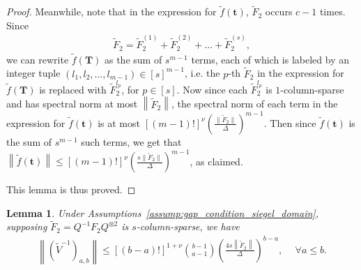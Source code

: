 \documentclass[superscriptaddress,onecolumn,nofootinbib,longbibliography,a4paper,accepted=2026-09-29]{quantumarticle}
\theoremstyle{plain}
\newtheorem{lemma}[thm]{Lemma}
\theoremstyle{definition}
\numberwithin{thm}{section}
\numberwithin{assumption}{section}
\numberwithin{lemma}{section}
\numberwithin{prop}{section}
\numberwithin{cor}{section}
\numberwithin{definition}{section}
\numberwithin{rmk}{section}
\numberwithin{equation}{section}
\newcommand{\norm}[1]     {\left\| #1 \right\|}
\newcommand{\lrb}[1]{\left ( #1 \right )}
\newcommand{\lrsb}[1]{\left [ #1 \right ]}
\newcommand{\mbt}{\mathbf{t}}
\newcommand{\mbf}{\mathbf{T}}
\begin{document}
\begin{proof}
Meanwhile, note that in the expression for $\tilde{f}(\mbt)$, $\tilde{F}_2$ occurs $c-1$ times. Since
\begin{align}
\tilde{F}_2= \tilde{F}_2^{(1)} + \tilde{F}_2^{(2)} + \dots + \tilde{F}_2^{(s)},
\end{align}
we can rewrite $\tilde{f}(\mbf)$ as the sum of $s^{m-1}$ terms, each of which is labeled by an integer tuple $(l_1,l_2,\dots,l_{m-1}) \in [s]^{m-1}$, i.e. the $p$-th $\tilde{F}_2$ in the expression for $\tilde{f}(\mbf)$ is replaced with $\tilde{F}_2^{l_p}$, for $p \in [s]$. Now since each $\tilde{F}_2^{l_p}$ is $1$-column-sparse and has spectral norm at most $\norm{\tilde{F}_2}$, the spectral norm of each term in the expression for $\tilde{f}(\mbt)$ is at most \([(m-1)!]^\nu \left( \frac{\| \tilde{F}_2 \|}{\Delta} \right)^{m-1} \). Then since $\tilde{f}(\mbt)$ is the sum of $s^{m-1}$ such terms, we get that 
$\norm{\tilde{f}(\mbt)} \le [(m-1)!]^\nu  \left( \frac{s\| \tilde{F}_2 \|}{\Delta} \right)^{m-1}$, as claimed.

This lemma is thus proved.
\end{proof}

\begin{lemma}
Under Assumptions~\ref{assump:gap_condition_siegel_domain},
supposing $\tilde{F}_2 = Q^{-1}F_2 Q^{\otimes 2}$ is $s$-column-sparse, we have
\begin{align}
\norm{\lrb{\tilde{V}^{-1}}_{a,b}} \le \lrsb{(b-a)!}^{1+\nu}\binom{b-1}{a-1}\lrb{\frac{4s\norm{\tilde{F}_2}}{\Delta}}^{b-a},~&~\forall a\le b.
\end{align}
\label{lem:wij_norm_bound_siegel_domain}    
\end{lemma}
\end{document}
